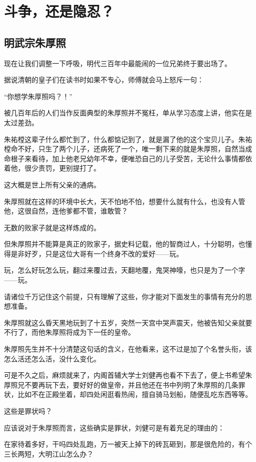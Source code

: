 \section{斗争，还是隐忍？}
\ifnum{}
	\begin{multicols}{\theparacolNo}
		\fi
		\subsection{明武宗朱厚照}
		现在让我们调整一下呼吸，明代三百年中最能闹的一位兄弟终于要出场了。

		据说清朝的皇子们在读书时如果不专心，师傅就会马上怒斥一句：

		“你想学朱厚照吗？！”

		被几百年后的人们当作反面典型的朱厚照并不冤枉，单从学习态度上讲，他实在是太过差劲。

		朱祐樘这辈子什么都忙到了，什么都惦记到了，就是漏了他的这个宝贝儿子。朱祐樘命不好，只生了两个儿子，还病死了一个，唯一剩下来的就是朱厚照，自然当成命根子来看待，加上他老兄幼年不幸，便唯恐自己的儿子受苦，无论什么事情都依着他，很少责罚，更别提打了。

		这大概是世上所有父亲的通病。

		朱厚照就在这样的环境中长大，天不怕地不怕，想要什么就有什么，也没有人管他，这很自然，连他爹都不管，谁敢管？

		无数的败家子就是这样炼成的。

		但朱厚照并不能算是真正的败家子，据史料记载，他的智商过人，十分聪明，也懂得是非好歹，只是这位大哥有一个终身不改的爱好——玩。

		玩，怎么好玩怎么玩，翻过来覆过去，天翻地覆，鬼哭神嚎，也只是为了一个字——玩。

		请诸位千万记住这个前提，只有理解了这些，你才能对下面发生的事情有充分的思想准备。

		朱厚照就这么昏天黑地玩到了十五岁，突然一天宫中哭声震天，他被告知父亲就要不行了，而他朱厚照将成为下一任的皇帝。

		朱厚照先生并不十分清楚这句话的含义，在他看来，这不过是加了个名誉头衔，该怎么活还怎么活，没什么变化。

		可是不久之后，麻烦就来了，内阁首辅大学士刘健再也看不下去了，便上书希望朱厚照兄不要再玩下去，要好好的做皇帝，并且他还在书中列明了朱厚照的几条罪状，比如不在正殿坐着，却四处闲逛看热闹，擅自骑马划船，随便乱吃东西等等。

		这些是罪状吗？

		应该说对于朱厚照而言，这些确实是罪状，刘健可是有着充足的理由的：

		在家待着多好，干吗四处乱跑，万一被天上掉下的砖瓦砸到，那是很危险的，有个三长两短，大明江山怎么办？


\end{multicols}
